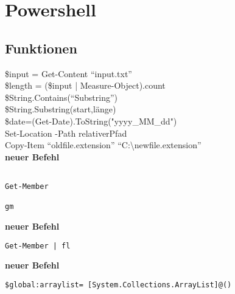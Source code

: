 \chapter{Powershell}\label{chap:Powershell}
\section{Funktionen}
\$input = Get-Content \enquote{input.txt}\\
\$length = (\$input | Measure-Object).count\\
\$String.Contains(\enquote{Substring})\\
\$String.Substring(start,länge)\\
\$date=(Get-Date).ToString("yyyy\_MM\_dd")\\
Set-Location -Path relativerPfad\\
Copy-Item \enquote{oldfile.extension} \enquote{C:\textbackslash newfile.extension}\\

\textbf{neuer Befehl}\begin{lstlisting}

Get-Member

gm

\end{lstlisting}
\textbf{neuer Befehl}\begin{lstlisting}Get-Member | fl
\end{lstlisting}
\textbf{neuer Befehl}\begin{lstlisting}
$global:arraylist= [System.Collections.ArrayList]@()
\end{lstlisting}